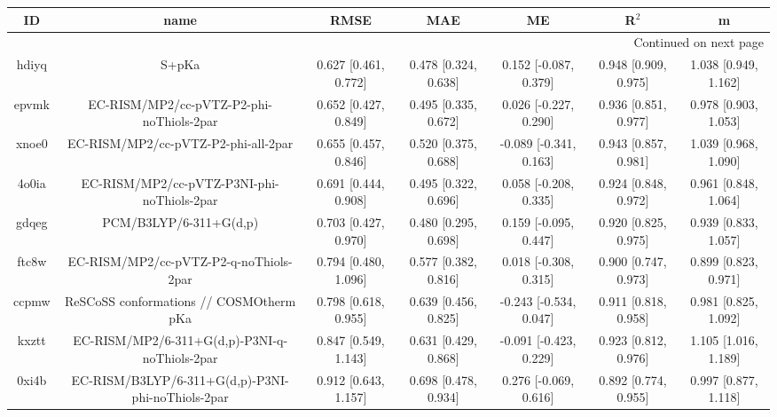 \documentclass{article}
\begin{document}
\begin{center}
\begin{longtable}{|ccccccc|}
\toprule
    ID &                                               name &                  RMSE &                   MAE &                       ME &                 R$^2$ &                      m \\
\midrule
\endhead
\midrule
\multicolumn{7}{r}{{Continued on next page}} \\
\midrule
\endfoot

\bottomrule
\endlastfoot
 hdiyq &                                              S+pKa &  0.627 [0.461, 0.772] &  0.478 [0.324, 0.638] &    0.152 [-0.087, 0.379] &  0.948 [0.909, 0.975] &   1.038 [0.949, 1.162] \\
 epvmk &           EC-RISM/MP2/cc-pVTZ-P2-phi-noThiols-2par &  0.652 [0.427, 0.849] &  0.495 [0.335, 0.672] &    0.026 [-0.227, 0.290] &  0.936 [0.851, 0.977] &   0.978 [0.903, 1.053] \\
 xnoe0 &                EC-RISM/MP2/cc-pVTZ-P2-phi-all-2par &  0.655 [0.457, 0.846] &  0.520 [0.375, 0.688] &   -0.089 [-0.341, 0.163] &  0.943 [0.857, 0.981] &   1.039 [0.968, 1.090] \\
 4o0ia &         EC-RISM/MP2/cc-pVTZ-P3NI-phi-noThiols-2par &  0.691 [0.444, 0.908] &  0.495 [0.322, 0.696] &    0.058 [-0.208, 0.335] &  0.924 [0.848, 0.972] &   0.961 [0.848, 1.064] \\
 gdqeg &                             PCM/B3LYP/6-311+G(d,p) &  0.703 [0.427, 0.970] &  0.480 [0.295, 0.698] &    0.159 [-0.095, 0.447] &  0.920 [0.825, 0.975] &   0.939 [0.833, 1.057] \\
 ftc8w &             EC-RISM/MP2/cc-pVTZ-P2-q-noThiols-2par &  0.794 [0.480, 1.096] &  0.577 [0.382, 0.816] &    0.018 [-0.308, 0.315] &  0.900 [0.747, 0.973] &   0.899 [0.823, 0.971] \\
 ccpmw &            ReSCoSS conformations // COSMOtherm pKa &  0.798 [0.618, 0.955] &  0.639 [0.456, 0.825] &   -0.243 [-0.534, 0.047] &  0.911 [0.818, 0.958] &   0.981 [0.825, 1.092] \\
 kxztt &      EC-RISM/MP2/6-311+G(d,p)-P3NI-q-noThiols-2par &  0.847 [0.549, 1.143] &  0.631 [0.429, 0.868] &   -0.091 [-0.423, 0.229] &  0.923 [0.812, 0.976] &   1.105 [1.016, 1.189] \\
 0xi4b &  EC-RISM/B3LYP/6-311+G(d,p)-P3NI-phi-noThiols-2par &  0.912 [0.643, 1.157] &  0.698 [0.478, 0.934] &    0.276 [-0.069, 0.616] &  0.892 [0.774, 0.955] &   0.997 [0.877, 1.118] \\

\end{longtable}
\end{center}
\end{document}
